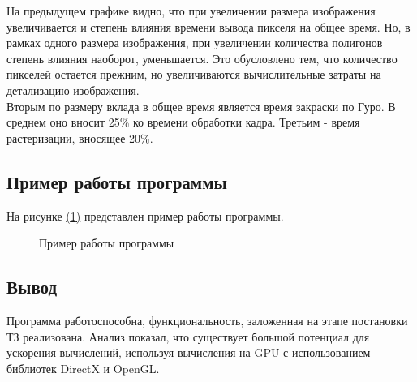 \documentclass{article}
\begin{document}
На предыдущем графике видно, что при увеличении размера изображения увеличивается и степень влияния времени вывода пикселя на общее время. Но, в рамках одного размера изображения, при увеличении количества полигонов степень влияния наоборот, уменьшается. Это обусловлено тем, что количество пикселей остается прежним, но увеличиваются вычислительные затраты на детализацию изображения.
	\\ \indent Вторым по размеру вклада в общее время является время закраски по Гуро. В среднем оно вносит 25\%  ко времени обработки кадра. Третьим - время растеризации, вносящее 20\%.
	\subsection{Пример работы программы}
На рисунке \hyperref[demonstrationMy]{(\ref{demonstrationMy})} представлен пример работы программы.
\begin{figure}[H]
		 \caption{Пример работы программы}
		 \label{demonstrationMy}
	 \end{figure}
	\subsection{Вывод}
	\indent Программа работоспособна, функциональность, заложенная на этапе постановки ТЗ реализована. Анализ показал, что существует большой потенциал для ускорения вычислений, используя вычисления на GPU с использованием библиотек DirectX и OpenGL.
\end{document}
